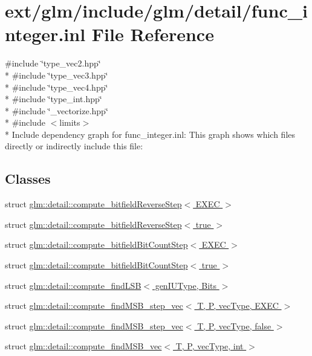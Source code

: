 \hypertarget{func__integer_8inl}{\section{ext/glm/include/glm/detail/func\-\_\-integer.inl File Reference}
\label{func__integer_8inl}
}
{\ttfamily \#include \char`\"{}type\-\_\-vec2.\-hpp\char`\"{}}\\*
{\ttfamily \#include \char`\"{}type\-\_\-vec3.\-hpp\char`\"{}}\\*
{\ttfamily \#include \char`\"{}type\-\_\-vec4.\-hpp\char`\"{}}\\*
{\ttfamily \#include \char`\"{}type\-\_\-int.\-hpp\char`\"{}}\\*
{\ttfamily \#include \char`\"{}\-\_\-vectorize.\-hpp\char`\"{}}\\*
{\ttfamily \#include $<$limits$>$}\\*
Include dependency graph for func\-\_\-integer.\-inl\-:
This graph shows which files directly or indirectly include this file\-:
\subsection*{Classes}
\begin{DoxyCompactItemize}
\item 
struct \hyperlink{structglm_1_1detail_1_1compute__bitfield_reverse_step}{glm\-::detail\-::compute\-\_\-bitfield\-Reverse\-Step$<$ E\-X\-E\-C $>$}
\item 
struct \hyperlink{structglm_1_1detail_1_1compute__bitfield_reverse_step_3_01true_01_4}{glm\-::detail\-::compute\-\_\-bitfield\-Reverse\-Step$<$ true $>$}
\item 
struct \hyperlink{structglm_1_1detail_1_1compute__bitfield_bit_count_step}{glm\-::detail\-::compute\-\_\-bitfield\-Bit\-Count\-Step$<$ E\-X\-E\-C $>$}
\item 
struct \hyperlink{structglm_1_1detail_1_1compute__bitfield_bit_count_step_3_01true_01_4}{glm\-::detail\-::compute\-\_\-bitfield\-Bit\-Count\-Step$<$ true $>$}
\item 
struct \hyperlink{structglm_1_1detail_1_1compute__find_l_s_b}{glm\-::detail\-::compute\-\_\-find\-L\-S\-B$<$ gen\-I\-U\-Type, Bits $>$}
\item 
struct \hyperlink{structglm_1_1detail_1_1compute__find_m_s_b__step__vec}{glm\-::detail\-::compute\-\_\-find\-M\-S\-B\-\_\-step\-\_\-vec$<$ T, P, vec\-Type, E\-X\-E\-C $>$}
\item 
struct \hyperlink{structglm_1_1detail_1_1compute__find_m_s_b__step__vec_3_01_t_00_01_p_00_01vec_type_00_01false_01_4}{glm\-::detail\-::compute\-\_\-find\-M\-S\-B\-\_\-step\-\_\-vec$<$ T, P, vec\-Type, false $>$}
\item 
struct \hyperlink{structglm_1_1detail_1_1compute__find_m_s_b__vec}{glm\-::detail\-::compute\-\_\-find\-M\-S\-B\-\_\-vec$<$ T, P, vec\-Type, int $>$}
\end{DoxyCompactItemize}
